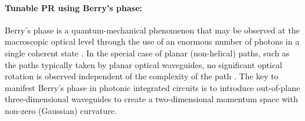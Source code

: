 \documentclass[../report.tex]{subfiles}
\begin{document}
\begin{itemize}[leftmargin=*]
		\paragraph*{Tunable PR using Berry's phase:}Berry’s phase is a quantum-mechanical phenomenon that may be observed at the macroscopic optical level through the use of an enormous number of photons in a single coherent state \cite{chiao_manifestations_1986}. In the special case of planar (non-helical) paths, such as the paths typically taken by planar optical waveguides, no significant optical rotation is observed independent of the complexity of the path \cite{tomita_observation_1986}. The key to manifest Berry’s phase in photonic integrated circuits is to introduce out-of-plane three-dimensional waveguides to create a two-dimensional momentum space with non-zero (Gaussian) curvature.
		
	\end{itemize}
	
\end{document}

